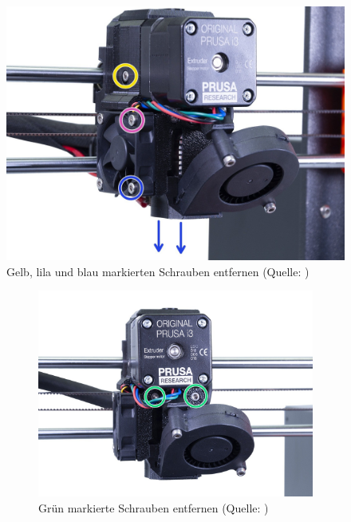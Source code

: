 \begin{itemize}
      \begin{figure}[h] 
        \centering
        \includegraphics[width=0.5\linewidth]{bilder/Anleitung - Schraubi1.jpg}
              \caption[Anleitung: Gelb, lila und blau markierten Schrauben entfernen] {Gelb, lila und blau markierten Schrauben entfernen (Quelle: \autocite{Prusa})}
        \label{Schraubi1}
      \end{figure}
      \FloatBarrier
      \begin{figure}[h]
        \centering
        \begin{subfigure}[b]{0.45\textwidth}
          \includegraphics[width=\textwidth]{bilder/Anleitung - Schraubi2.jpg}
          \caption[Anleitung: Grün markierte Schrauben entfernen] {Grün markierte Schrauben entfernen (Quelle: \autocite{Prusa})}
          \label{Schraubi2}
        \end{subfigure}
        \hfill
        \begin{subfigure}[b]{0.45\textwidth}

\end{subfigure}
\end{figure}
\end{itemize}
